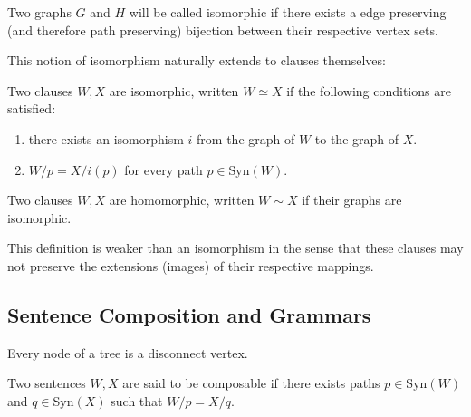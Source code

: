 \documentclass[twoside]{article}
\newenvironment{definition}[1][Definition]{\begin{trivlist}
\item[\hskip \labelsep {\bfseries #1}]}{\end{trivlist}}
\begin{document}
\begin{definition}[Graph Isomorphism]

Two graphs $ G $ and $ H $ will be called isomorphic if there exists a edge preserving (and therefore path preserving)
bijection between their respective vertex sets.

\end{definition}
This notion of isomorphism naturally extends to clauses themselves:

\begin{definition}[Clause Isomorphism]

Two clauses $ W, X $ are isomorphic, written $ W\simeq X $ if the following conditions are satisfied:

\begin{enumerate}

\item there exists an isomorphism $ i $ from the graph of $ W $ to the graph of $ X $. 

\item $ W/p=X/i(p) $ for every path $ p\in\mbox{Syn}(W) $.

\end{enumerate}

\end{definition}

\begin{definition}[Clause Homomorphism]

Two clauses $ W, X $ are homomorphic, written $ W\sim X $ if their graphs are isomorphic.

\end{definition}
This definition is weaker than an isomorphism in the sense that these clauses may not preserve the extensions
(images) of their respective mappings.

\subsection{Sentence Composition and Grammars}

Every node of a tree is a disconnect vertex.

\begin{definition}[Composable Sentences]

Two sentences $ W, X $ are said to be composable if there exists paths $ p\in\mbox{Syn}(W) $ and $ q\in\mbox{Syn}(X) $
such that $ W/p=X/q $.

\end{definition}
\end{document}
